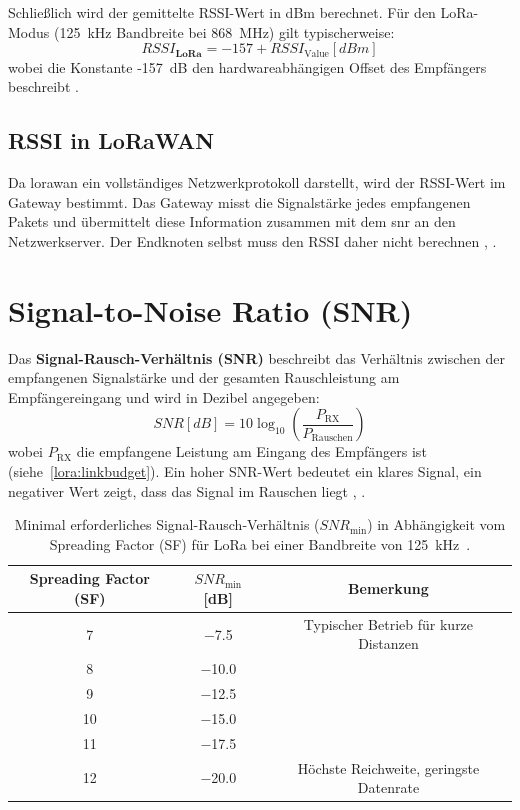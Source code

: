 		
		
	Schlie{\ss}lich wird der gemittelte RSSI-Wert in dBm berechnet. 
	Für den LoRa-Modus (125~kHz Bandbreite bei 868~MHz) gilt typischerweise:
	\[
	RSSI_{\textbf{LoRa}} = -157 + RSSI_{\text{Value}}  [dBm]
	\]
	wobei die Konstante -157~dB den hardwareabhängigen Offset des Empfängers beschreibt \cite{Semtech:2015b}.
	

\subsection{RSSI in LoRaWAN}

	Da \ac{lorawan} ein vollständiges Netzwerkprotokoll darstellt, wird der RSSI-Wert im Gateway bestimmt. Das Gateway misst die Signalstärke jedes empfangenen Pakets und übermittelt diese Information zusammen mit dem \ac{snr} an den Netzwerkserver. Der Endknoten selbst muss den RSSI daher nicht berechnen \cite{Montagny:2022}, \cite{Semtech:2015}.
	

\section{Signal-to-Noise Ratio (SNR) \label{lora:snr}}
	
	Das \textbf{Signal-Rausch-Verhältnis (SNR)} beschreibt das Verhältnis zwischen der empfangenen Signalstärke und der gesamten Rauschleistung am Empfängereingang und wird in Dezibel angegeben:
	\[
	SNR[dB] = 10 \log_{10}\!\left(\frac{P_\text{RX}}{P_\text{Rauschen}}\right)
	\]
	wobei \(P_\text{RX}\) die empfangene Leistung am Eingang des Empfängers ist (siehe~\ref{lora:linkbudget}).
	Ein hoher SNR-Wert bedeutet ein klares Signal, ein negativer Wert zeigt, dass das Signal im Rauschen liegt \cite{Montagny:2022}, \cite{Semtech:2015b}.

	\begin{table}[H]
		\centering
		\caption{Minimal erforderliches Signal-Rausch-Verhältnis (\(SNR_\text{min}\)) in Abhängigkeit vom Spreading Factor (SF) für LoRa bei einer Bandbreite von 125~kHz~\cite{Semtech:2015b}.}
		\label{lora:tab:snrmin}
		\begin{tabular}{c c c}
			\hline
			\textbf{Spreading Factor (SF)} & \textbf{\(SNR_\text{min}\) [dB]} & \textbf{Bemerkung} \\
			\hline
			7  & −7.5  & Typischer Betrieb für kurze Distanzen \\
			8  & −10.0 &  \\
			9  & −12.5 &  \\
			10 & −15.0 &  \\
			11 & −17.5 &  \\
			12 & −20.0 & Höchste Reichweite, geringste Datenrate \\
			\hline
		\end{tabular}
	\end{table}
	
